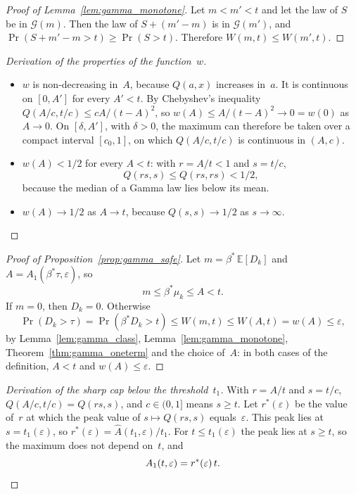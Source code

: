 \documentclass[11pt,a4paper]{article}
\theoremstyle{plain}
\theoremstyle{definition}
\theoremstyle{remark}
\begin{document}
\label{prf:lem:gamma_monotone}
\begin{proof}[Proof of Lemma~\ref{lem:gamma_monotone}]
Let $m < m' < t$ and let the law of $S$ be in $\mathcal{G}(m)$.
Then the law of $S + (m' - m)$ is in $\mathcal{G}(m')$, and $\Pr(S + m' - m > t) \ge \Pr(S > t)$.
Therefore $W(m, t) \le W(m', t)$.
\end{proof}

\label{drv:gamma_w}
\begin{proof}[Derivation of the properties of the function~$w$]
\begin{itemize}
  \item $w$ is non-decreasing in~$A$, because $Q(a, x)$ increases in~$a$.
    It is continuous on $[0, A']$ for every $A' < t$.
    By Chebyshev's inequality $Q(A/c, t/c) \le cA/(t - A)^2$, so $w(A) \le A/(t - A)^2 \to 0 = w(0)$ as $A \to 0$.
    On $[\delta, A']$, with $\delta > 0$, the maximum can therefore be taken over a compact interval $[c_0, 1]$, on which $Q(A/c, t/c)$ is continuous in $(A, c)$.
  \item $w(A) < 1/2$ for every $A < t$: with $r = A/t < 1$ and $s = t/c$,
    \begin{equation}
      Q(rs, s) \le Q(rs, rs) < 1/2,
    \end{equation}
    because the median of a Gamma law lies below its mean.
  \item $w(A) \to 1/2$ as $A \to t$, because $Q(s, s) \to 1/2$ as $s \to \infty$.
\end{itemize}
\end{proof}

\label{prf:prop:gamma_safe}
\begin{proof}[Proof of Proposition~\ref{prop:gamma_safe}]
Let $m = \beta^*\,\mathbb{E}[D_k]$ and $A = A_1(\beta^*\tau, \varepsilon)$, so
\begin{equation}
  m \le \beta^*\mu_k \le A < t.
\end{equation}
If $m = 0$, then $D_k = 0$.
Otherwise
\begin{equation}
  \Pr(D_k > \tau) = \Pr(\beta^* D_k > t) \le W(m, t) \le W(A, t) = w(A) \le \varepsilon,
\end{equation}
by Lemma~\ref{lem:gamma_class}, Lemma~\ref{lem:gamma_monotone}, Theorem~\ref{thm:gamma_oneterm} and the choice of~$A$: in both cases of the definition, $A < t$ and $w(A) \le \varepsilon$.
\end{proof}

\label{drv:gamma_below}
\begin{proof}[Derivation of the sharp cap below the threshold~$t_1$]
With $r = A/t$ and $s = t/c$, $Q(A/c, t/c) = Q(rs, s)$, and $c \in (0, 1]$ means $s \ge t$.
Let $r^*(\varepsilon)$ be the value of~$r$ at which the peak value of $s \mapsto Q(rs, s)$ equals~$\varepsilon$. This peak lies at $s = t_1(\varepsilon)$, so $r^*(\varepsilon) = \hat A(t_1, \varepsilon)/t_1$. For $t \le t_1(\varepsilon)$ the peak lies at $s \ge t$, so the maximum does not depend on~$t$, and
\begin{equation}
  A_1(t, \varepsilon) = r^*(\varepsilon)\, t. \qedhere
\end{equation}
\end{proof}
\end{document}
